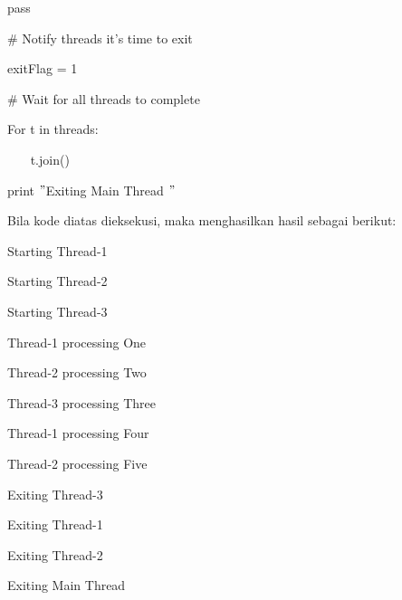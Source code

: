 \documentclass{wileySix}
\begin{document}
\begin{myEnumerate}
\noindent 
{\fontsize{10pt}{10pt}\selectfont pass} \par
\vspace{10pt}
\noindent 
{\fontsize{10pt}{10pt}\selectfont  $  \#  $ Notify threads it’s time to exit} \par
\noindent 
{\fontsize{10pt}{10pt}\selectfont exitFlag = 1} \par
\vspace{10pt}
\noindent 
{\fontsize{10pt}{10pt}\selectfont  $  \#  $ Wait for all threads to complete} \par
\noindent 
{\fontsize{10pt}{10pt}\selectfont For t in threads:} \par
\noindent 
{\fontsize{10pt}{10pt}\selectfont ~~~ t.join()} \par
\noindent 
{\fontsize{10pt}{10pt}\selectfont print  $ " $Exiting Main Thread $ " $} \par
\vspace{10pt}
\noindent 
Bila kode diatas dieksekusi, maka menghasilkan hasil sebagai berikut: \par
\vspace{12pt}
\noindent 
{\fontsize{10pt}{10pt}\selectfont Starting Thread-1} \par
\noindent 
{\fontsize{10pt}{10pt}\selectfont Starting Thread-2} \par
\noindent 
{\fontsize{10pt}{10pt}\selectfont Starting Thread-3} \par
\noindent 
{\fontsize{10pt}{10pt}\selectfont Thread-1 processing One} \par
\noindent 
{\fontsize{10pt}{10pt}\selectfont Thread-2 processing Two} \par
\noindent 
{\fontsize{10pt}{10pt}\selectfont Thread-3 processing Three} \par
\noindent 
{\fontsize{10pt}{10pt}\selectfont Thread-1 processing Four} \par
\noindent 
{\fontsize{10pt}{10pt}\selectfont Thread-2 processing Five} \par
\noindent 
{\fontsize{10pt}{10pt}\selectfont Exiting Thread-3} \par
\noindent 
{\fontsize{10pt}{10pt}\selectfont Exiting Thread-1} \par
\noindent 
{\fontsize{10pt}{10pt}\selectfont Exiting Thread-2} \par
\noindent 
{\fontsize{10pt}{10pt}\selectfont Exiting Main Thread} \par
\noindent 
\vspace{40pt}


\end{myEnumerate}
\end{document}
